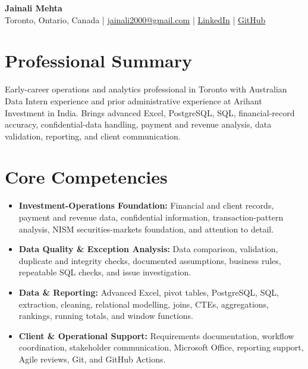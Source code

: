 \documentclass[letterpaper,10pt]{article}
\begin{document}
\begin{center}
  {\fontsize{17}{19}\selectfont\textbf{Jainali Mehta}}\\[2pt]
  \small Toronto, Ontario, Canada \;|\;
  \href{mailto:jainali2000@gmail.com}{jainali2000@gmail.com} \;|\;
  \href{https://www.linkedin.com/in/jainali-mehta}{LinkedIn} \;|\;
  \href{https://github.com/jainalimehta}{GitHub}
\end{center}
\vspace{-7pt}

\section{Professional Summary}
\small Early-career operations and analytics professional in Toronto with Australian Data Intern experience and prior administrative experience at Arihant Investment in India. Brings advanced Excel, PostgreSQL, SQL, financial-record accuracy, confidential-data handling, payment and revenue analysis, data validation, reporting, and client communication.

\section{Core Competencies}
\begin{itemize}[leftmargin=0.16in,label=\textbullet,topsep=0pt,itemsep=1pt,parsep=0pt]
  \item \small \textbf{Investment-Operations Foundation:} Financial and client records, payment and revenue data, confidential information, transaction-pattern analysis, NISM securities-markets foundation, and attention to detail.
  \item \small \textbf{Data Quality \& Exception Analysis:} Data comparison, validation, duplicate and integrity checks, documented assumptions, business rules, repeatable SQL checks, and issue investigation.
  \item \small \textbf{Data \& Reporting:} Advanced Excel, pivot tables, PostgreSQL, SQL, extraction, cleaning, relational modelling, joins, CTEs, aggregations, rankings, running totals, and window functions.
  \item \small \textbf{Client \& Operational Support:} Requirements documentation, workflow coordination, stakeholder communication, Microsoft Office, reporting support, Agile reviews, Git, and GitHub Actions.
\end{itemize}
\end{document}
